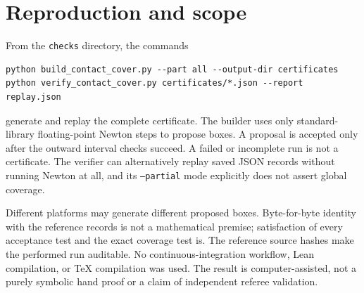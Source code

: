 \documentclass[11pt]{article}
\begin{document}
\section{Reproduction and scope}
From the \texttt{checks} directory, the commands
\begin{verbatim}
python build_contact_cover.py --part all --output-dir certificates
python verify_contact_cover.py certificates/*.json --report replay.json
\end{verbatim}
generate and replay the complete certificate. The builder uses only standard-library floating-point Newton steps to propose boxes. A proposal is accepted only after the outward interval checks succeed. A failed or incomplete run is not a certificate. The verifier can alternatively replay saved JSON records without running Newton at all, and its \texttt{--partial} mode explicitly does not assert global coverage.

Different platforms may generate different proposed boxes. Byte-for-byte identity with the reference records is not a mathematical premise; satisfaction of every acceptance test and the exact coverage test is. The reference source hashes make the performed run auditable. No continuous-integration workflow, Lean compilation, or TeX compilation was used. The result is computer-assisted, not a purely symbolic hand proof or a claim of independent referee validation.
\end{document}
